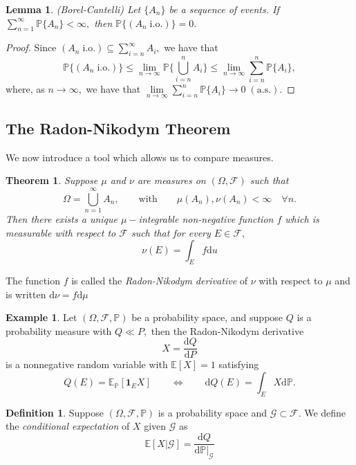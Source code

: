 \documentclass[openany, amssymb, psamsfonts]{amsart}
\newtheorem{thm}{Theorem}[section]
\newtheorem{lem}{Lemma}[section]
\theoremstyle{definition}
\newtheorem{defn}{Definition}[section]
\newtheorem{exmp}{Example}[section]
\numberwithin{equation}{section}
\newcommand{\bbE}{\mathbb{E}}
\newcommand{\bbP}{\mathbb{P}}
\newcommand{\dd}{\mathrm{d}}
\begin{document}
\begin{lem}
(Borel-Cantelli)
Let $\{A_n\}$ be a sequence of events. If $\displaystyle\sum_{n=1}^\infty \bbP\{A_n\}<\infty,$ then $\bbP\{(A_n \; \text{i.o.})\} = 0.$
\end{lem}

\begin{proof}
Since $(A_n \; \text{i.o.}) \subseteq \displaystyle\sum_{i=n}^\infty A_i,$ we have that
\[\bbP\{(A_n \; \text{i.o.})\} \leq \lim\limits_{n\to \infty}\bbP\{\bigcup_{i=n}^n A_i\}\leq \lim\limits_{n\to \infty}\sum_{i=n}^n \bbP\{A_i\},\] where, as $n\to \infty,$ we have that $\displaystyle\lim\limits_{n\to \infty}\displaystyle\sum_{i=n}^n \bbP\{A_i\}\to 0 \; (\text{a.s.}).$
\end{proof}




\subsection{The Radon-Nikodym Theorem} %
We now introduce a tool which allows us to compare measures.  
\begin{thm}
Suppose $\mu$ and $\nu$ are measures on $(\Omega, \mathcal{F})$ such that
\[\Omega = \bigcup_{n=1}^\infty A_n, \qquad \text{with} \qquad \mu(A_n), \nu(A_n) < \infty \quad \forall n.\] Then there exists a unique $\mu-$integrable non-negative function $f$ which is measurable with respect to $\mathcal{F}$ such that for every $E\in \mathcal{F},$
\[\nu(E) = \int_E f\mathrm{d}u\]
\end{thm}

The function $f$ is called the \textit{Radon-Nikodym derivative} of $\nu$ with respect to $\mu$ and is written $\mathrm{d}\nu = f\mathrm{d}\mu$

\begin{exmp}%
Let $(\Omega, \mathcal{F}, \bbP)$ be a probability space, and suppose $Q$ is a probability measure with $Q\ll P,$ then the Radon-Nikodym derivative 
\[X = \frac{\dd Q}{\dd P}\]
is a nonnegative random variable with $\bbE[X] =1$ satisfying 
\[Q(E) = \bbE_\bbP[ \textbf{1}_E X] \qquad \Leftrightarrow \qquad \dd Q(E) = \int_E X \dd \bbP.\]
\end{exmp}

\begin{defn} %
Suppose $(\Omega, \mathcal{F}, \bbP)$ is a probability space and $\mathcal{G}\subset \mathcal{F}.$ We define the \textit{conditional expectation} of $X$ given $\mathcal{G}$ as
\[\bbE[X | \mathcal{G}] =\frac{\dd Q}{\dd\bbP|_\mathcal{G}}\]
\end{defn}
\end{document}
